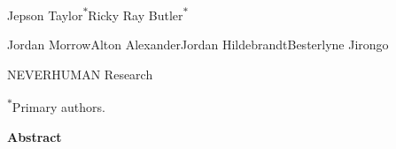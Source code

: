 \documentclass[10pt,letterpaper,twocolumn]{article}
\begin{document}
\onecolumn
\thispagestyle{front}
\vspace*{-0.40in}
\begin{center}
{\bfseries\fontsize{18.5}{22}\selectfont\color{ink}\PaperTitle\par}
\vspace{5pt}
{\fontsize{12.5}{15}\selectfont\color{ink}\PaperDescriptor\par}
\vspace{11pt}
{\fontsize{10.6}{14}\selectfont\color{ink}Jepson Taylor\textsuperscript{$\ast$}\hspace{2em}Ricky Ray Butler\textsuperscript{$\ast$}\par
Jordan Morrow\hspace{1.6em}Alton Alexander\hspace{1.6em}Jordan Hildebrandt\hspace{1.6em}Besterlyne Jirongo\par}
\vspace{4pt}
{\fontsize{9.8}{12}\selectfont\color{ink}NEVERHUMAN Research\par}
\vspace{3pt}
{\fontsize{8.6}{11}\selectfont\color{sub}\textsuperscript{$\ast$}Primary authors.\par}
\end{center}
\vspace{7pt}
\begin{center}
\begin{minipage}{0.88\textwidth}
{\centering\bfseries\fontsize{10}{12}\selectfont Abstract\par}\vspace{4pt}
\fontsize{9.6}{12.2}\selectfont\noindent

\end{minipage}
\end{center}
\vspace{4pt}


\twocolumn












\end{document}
